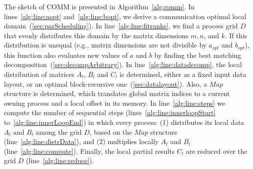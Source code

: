 \documentclass[sigplan,review,anonymous]{acmart}\settopmatter{printfolios=true,printccs=false,printacmref=false}
\begin{document}
The sketch of COMM is presented in
Algorithm~\ref{alg:comm}. In lines~\ref{alg:line:aopt} and~\ref{alg:line:bopt}, 
we derive a communication optimal local domain~(\cref{sec:parScheduling}). In 
line~\ref{alg:line:fitranks}, we find a 
process grid $D$ that evenly distributes this domain by the matrix dimensions 
$m,n$, 
and $k$. If this distribution is unequal (e.g., matrix dimensions are not 
divisible by $a_{opt}$ and $b_{opt}$), this function also evaluates new values 
of 
$a$ and $b$ by finding the best matching 
decomposition~(\cref{sec:decompArbitrary}).
 In line~\ref{alg:line:datadecomp}, 
the local distribution of matrices $A_l$, $B_l$ and $C_l$ is determined, either 
as a fixed input data layout, or an optimal block-recursive 
one~(\cref{sec:datalayout}). Also, a $Map$ structure is determined, which 
translates global matrix indices to a current owning process and a local offset 
in its memory.
 In line~\ref{alg:line:steps} we 
compute the number of sequential steps (lines~\ref{alg:line:innerloopStart} 
to~\ref{alg:line:innerLoopEnd}) in which every process: (1) distributes its 
local 
data $A_l$ and $B_l$  among the grid $D$, based on the $Map$ structure 
(line~\ref{alg:line:distrData}), and (2) multiplies locally $A_l$ and $B_l$ 
(line~\ref{alg:line:compute}). Finally, the local partial results $C_l$ are 
reduced over the grid $D$ (line~\ref{alg:line:reduce}).
\end{document}
